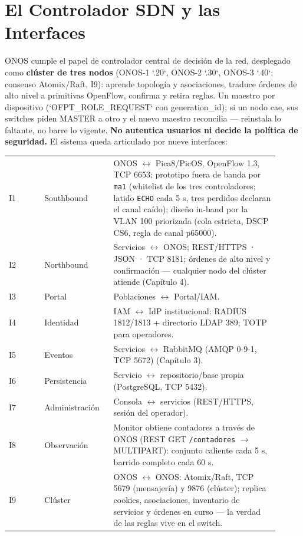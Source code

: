 \documentclass[11pt,a4paper]{report}
\begin{document}
\section{El Controlador SDN y las Interfaces}
ONOS cumple el papel de controlador central de decisión de la red, desplegado como \textbf{clúster de tres nodos} (ONOS-1 `.20`, ONOS-2 `.30`, ONOS-3 `.40`; consenso Atomix/Raft, I9): aprende topología y asociaciones, traduce órdenes de alto nivel a primitivas OpenFlow, confirma y retira reglas. Un maestro por dispositivo (`OFPT_ROLE_REQUEST` con generation\_id); si un nodo cae, sus switches piden MASTER a otro y el nuevo maestro reconcilia — reinstala lo faltante, no barre lo vigente. \textbf{No autentica usuarios ni decide la política de seguridad.} El sistema queda articulado por nueve interfaces:

\begin{longtable}{p{0.12\linewidth}p{0.23\linewidth}p{0.56\linewidth}}
\toprule
I1 & Southbound & ONOS $\leftrightarrow$ Pica8/PicOS, OpenFlow 1.3, TCP 6653; prototipo fuera de banda por \texttt{ma1} (whitelist de los tres controladores; latido \texttt{ECHO} cada 5 s, tres perdidos declaran el canal caído); diseño in-band por la VLAN 100 priorizada (cola estricta, DSCP CS6, regla de canal p65000). \\
I2 & Northbound & Servicios $\leftrightarrow$ ONOS; REST/HTTPS · JSON · TCP 8181; órdenes de alto nivel y confirmación — cualquier nodo del clúster atiende (Capítulo 4). \\
I3 & Portal & Poblaciones $\leftrightarrow$ Portal/IAM. \\
I4 & Identidad & IAM $\leftrightarrow$ IdP institucional: RADIUS 1812/1813 + directorio LDAP 389; TOTP para operadores. \\
I5 & Eventos & Servicios $\leftrightarrow$ RabbitMQ (AMQP 0-9-1, TCP 5672) (Capítulo 3). \\
I6 & Persistencia & Servicio $\leftrightarrow$ repositorio/base propia (PostgreSQL, TCP 5432). \\
I7 & Administración & Consola $\leftrightarrow$ servicios (REST/HTTPS, sesión del operador). \\
I8 & Observación & Monitor obtiene contadores a través de ONOS (REST GET \texttt{/contadores} $\rightarrow$ MULTIPART): conjunto caliente cada 5 s, barrido completo cada 60 s. \\
I9 & Clúster & ONOS $\leftrightarrow$ ONOS: Atomix/Raft, TCP 5679 (mensajería) y 9876 (clúster); replica cookies, asociaciones, inventario de servicios y órdenes en curso — la verdad de las reglas vive en el switch. \\
\bottomrule
\end{longtable}
\end{document}
